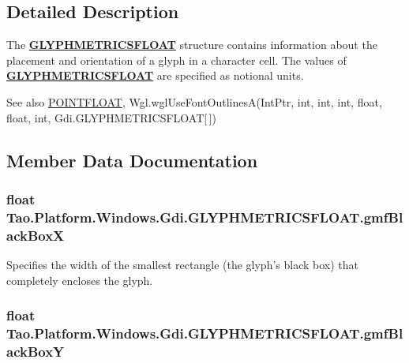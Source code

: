 \subsection{Detailed Description}
The {\bfseries \hyperlink{struct_tao_1_1_platform_1_1_windows_1_1_gdi_1_1_g_l_y_p_h_m_e_t_r_i_c_s_f_l_o_a_t}{GLYPHMETRICSFLOAT}} structure contains information about the placement and orientation of a glyph in a character cell. The values of {\bfseries \hyperlink{struct_tao_1_1_platform_1_1_windows_1_1_gdi_1_1_g_l_y_p_h_m_e_t_r_i_c_s_f_l_o_a_t}{GLYPHMETRICSFLOAT}} are specified as notional units. \begin{DoxySeeAlso}{See also}
\hyperlink{struct_tao_1_1_platform_1_1_windows_1_1_gdi_1_1_p_o_i_n_t_f_l_o_a_t}{POINTFLOAT}, Wgl.wglUseFontOutlinesA(IntPtr, int, int, int, float, float, int, Gdi.GLYPHMETRICSFLOAT\mbox{[}$\,$\mbox{]})


\end{DoxySeeAlso}


\subsection{Member Data Documentation}
\hypertarget{struct_tao_1_1_platform_1_1_windows_1_1_gdi_1_1_g_l_y_p_h_m_e_t_r_i_c_s_f_l_o_a_t_a32e06d195b8249225944b0bf5b0cf67b}{
\subsubsection[{gmfBlackBoxX}]{\setlength{\rightskip}{0pt plus 5cm}float {\bf Tao.Platform.Windows.Gdi.GLYPHMETRICSFLOAT.gmfBlackBoxX}}}
\label{struct_tao_1_1_platform_1_1_windows_1_1_gdi_1_1_g_l_y_p_h_m_e_t_r_i_c_s_f_l_o_a_t_a32e06d195b8249225944b0bf5b0cf67b}


Specifies the width of the smallest rectangle (the glyph's black box) that completely encloses the glyph. 

\hypertarget{struct_tao_1_1_platform_1_1_windows_1_1_gdi_1_1_g_l_y_p_h_m_e_t_r_i_c_s_f_l_o_a_t_a934ea63e108f801aae715e3d42a617dd}{
\subsubsection[{gmfBlackBoxY}]{\setlength{\rightskip}{0pt plus 5cm}float {\bf Tao.Platform.Windows.Gdi.GLYPHMETRICSFLOAT.gmfBlackBoxY}}}
\label{struct_tao_1_1_platform_1_1_windows_1_1_gdi_1_1_g_l_y_p_h_m_e_t_r_i_c_s_f_l_o_a_t_a934ea63e108f801aae715e3d42a617dd}


